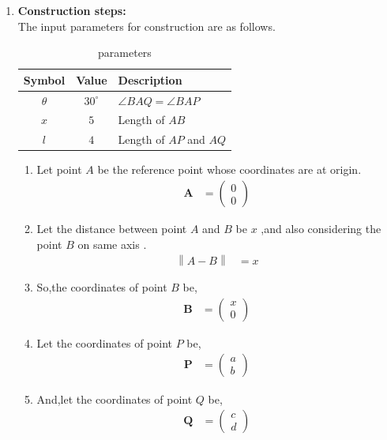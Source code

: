 \documentclass[11pt, a4paper]{article}
\newcommand{\myvec}[1]{\ensuremath{\begin{pmatrix}#1\end{pmatrix}}}
\let\vec\mathbf
\providecommand{\norm}[1]{\left\lVert#1\right\rVert}
\begin{document}
\begin{enumerate}
\item \textbf{Construction steps:} \\
	The input parameters for construction are as follows.

\begin{table}[H]
\begin{center}
 \begin{tabular}{|c|c|p{6cm}|}
	 \hline  
        \textbf{Symbol} & \textbf{Value} & \textbf{Description} \\
        \hline
        $\theta$ & $30^\circ$ & $\angle BAQ = \angle BAP$ \\
        \hline
        $x$ & $5$ & Length of $AB$ \\
        \hline
        $l$ & $4$ & Length of $AP$ and $AQ$ \\
        \hline
    \end{tabular}
\end{center}
\caption{parameters}
\label{tab:parameters}
\end{table}

\begin{enumerate}

\item Let point $A$ be the reference point whose coordinates are at origin. 
\begin{align}
\vec{A} &= \myvec{0 \\ 0}
\end{align}

\item Let the distance between point $A$ and $B$ be $x$ ,and also considering the point $B$ on same axis .
\begin{align}
	\norm{A-B} &= x 
\end{align}

\item So,the coordinates of point $B$ be,
\begin{align}
\vec{B} &= \myvec{x \\ 0}
\end{align}

\item Let the coordinates of point $P$ be,
\begin{align}
\vec{P} &= \myvec{ a \\ b} 
\end{align}

\item And,let the coordinates of point $Q$ be,
\begin{align}
\vec{Q} &= \myvec{ c \\ d} 
\end{align}


\end{enumerate}
\end{enumerate}
\end{document}
